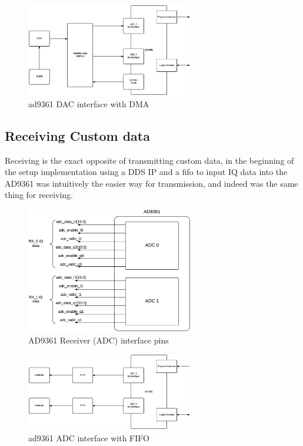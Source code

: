 \begin{figure}[htbp]
    \centering
    \includegraphics[width=0.65\textwidth]{./figures/dac_dma}
    \caption{ ad9361 DAC interface with DMA
    \label{fig:ad9361txdma}}
\end{figure}

\subsection{Receiving Custom data}

Receiving is the exact opposite of transmitting custom data, in the beginning of
the setup implementation using a DDS IP and a fifo to input IQ data into the
AD9361 was intuitively the easier way for transmission, and indeed was the same
thing for receiving.

\begin{figure}[htbp]
    \centering
    \includegraphics[width=0.65\textwidth]{./figures/ad9361rx_pins}
    \caption{ AD9361 Receiver (ADC) interface pins
    \label{fig:rxpins}}
\end{figure}

\begin{figure}[htbp]
    \centering
    \includegraphics[width=0.65\textwidth]{./figures/adc_fifo}
    \caption{ ad9361 ADC interface with FIFO
    \label{fig:ad9361rxfifo}}
\end{figure}

